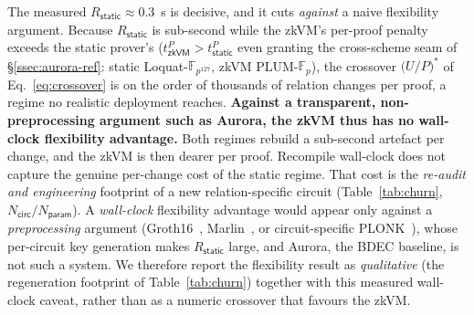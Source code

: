 The measured $R_{\mathsf{static}}\approx 0.3$~s is decisive, and it cuts \emph{against} a naive flexibility argument. Because $R_{\mathsf{static}}$ is sub-second while the zkVM's per-proof penalty exceeds the static prover's ($t^{P}_{\mathsf{zkVM}}>t^{P}_{\mathsf{static}}$ even granting the cross-scheme seam of \S\ref{ssec:aurora-ref}: static Loquat-$\mathbb{F}_{p^{127}}$, zkVM PLUM-$\mathbb{F}_{p}$), the crossover $\bigl(U/P\bigr)^{*}$ of Eq.~\ref{eq:crossover} is on the order of thousands of relation changes per proof, a regime no realistic deployment reaches. \textbf{Against a transparent, non-preprocessing argument such as Aurora, the zkVM thus has no wall-clock flexibility advantage.} Both regimes rebuild a sub-second artefact per change, and the zkVM is then dearer per proof. Recompile wall-clock does not capture the genuine per-change cost of the static regime. That cost is the \emph{re-audit and engineering} footprint of a new relation-specific circuit (Table~\ref{tab:churn}, $N_{\mathsf{circ}}/N_{\mathsf{param}}$). A \emph{wall-clock} flexibility advantage would appear only against a \emph{preprocessing} argument (Groth16~\cite{groth2016}, Marlin~\cite{chiesa2020marlin}, or circuit-specific PLONK~\cite{gabizon2019plonk}), whose per-circuit key generation makes $R_{\mathsf{static}}$ large, and Aurora, the BDEC baseline, is not such a system. We therefore report the flexibility result as \emph{qualitative} (the regeneration footprint of Table~\ref{tab:churn}) together with this measured wall-clock caveat, rather than as a numeric crossover that favours the zkVM.

